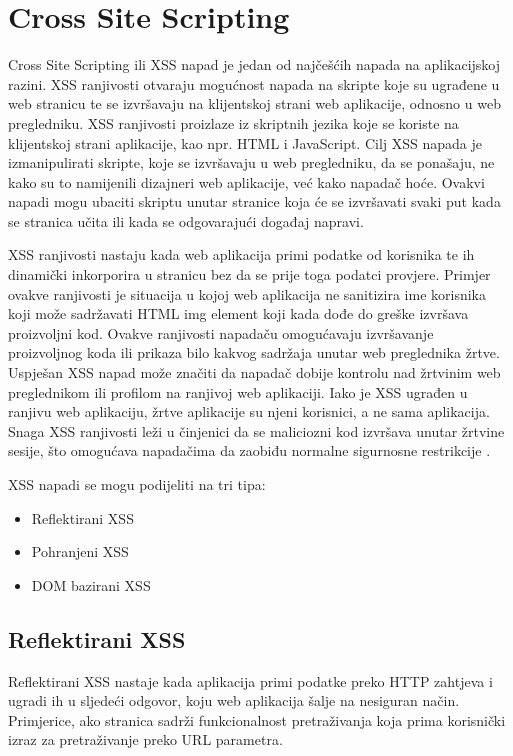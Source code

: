 \documentclass[12pt, oneside, onecolumn]{book}
\begin{document}
{\section{Cross Site Scripting}
Cross Site Scripting ili XSS napad je jedan od najčešćih napada na aplikacijskoj razini. XSS ranjivosti otvaraju mogućnost napada na skripte koje su ugrađene u web stranicu te se izvršavaju na klijentskoj strani web aplikacije, odnosno u web pregledniku. XSS ranjivosti proizlaze iz skriptnih jezika koje se koriste na klijentskoj strani aplikacije, kao npr. HTML i JavaScript. Cilj XSS napada je izmanipulirati skripte, koje se izvršavaju u web pregledniku, da se ponašaju, ne kako su to namijenili dizajneri web aplikacije, već kako napadač hoće. Ovakvi napadi mogu ubaciti skriptu unutar stranice koja će se izvršavati svaki put kada se stranica učita ili kada se odgovarajući događaj napravi.

\pagebreak

XSS ranjivosti nastaju kada web aplikacija primi podatke od korisnika te ih dinamički inkorporira u stranicu bez da se prije toga podatci provjere. Primjer ovakve ranjivosti je situacija u kojoj web aplikacija ne sanitizira ime korisnika koji može sadržavati HTML img element koji kada dođe do greške izvršava proizvoljni kod. Ovakve ranjivosti napadaču omogućavaju izvršavanje proizvoljnog koda ili prikaza bilo kakvog sadržaja unutar web preglednika žrtve. Uspješan XSS napad može značiti da napadač dobije kontrolu nad žrtvinim web preglednikom ili profilom na ranjivoj web aplikaciji. Iako je XSS ugrađen u ranjivu web aplikaciju, žrtve aplikacije su njeni korisnici, a ne sama aplikacija. Snaga XSS ranjivosti leži u činjenici da se maliciozni kod izvršava unutar žrtvine sesije, što omogućava napadačima da zaobiđu normalne sigurnosne restrikcije \cite{xsstut}.

XSS napadi se mogu podijeliti na tri tipa:

\begin{itemize}
\item Reflektirani XSS
\item Pohranjeni XSS
\item DOM bazirani XSS
\end{itemize}

\subsection{Reflektirani XSS}
Reflektirani XSS nastaje kada aplikacija primi podatke preko HTTP zahtjeva i ugradi ih u sljedeći odgovor, koju web aplikacija šalje na nesiguran način. Primjerice, ako stranica sadrži funkcionalnost pretraživanja koja prima korisnički izraz za pretraživanje preko URL parametra.

}
\end{document}
